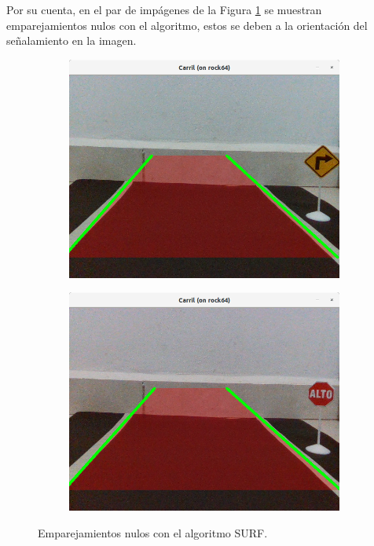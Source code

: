 \par Por su cuenta, en el par de impágenes de la Figura \ref{fig:NSURF} se muestran emparejamientos nulos con el algoritmo, estos se deben a la orientación del señalamiento en la imagen.
\begin{figure}[htbp!]
	\centering
	\begin{subfigure}[htbp!]{0.4\textwidth}
		\includegraphics[width=\textwidth]{./Figuras/NSURF1}
	\end{subfigure}
	\begin{subfigure}[htbp!]{0.4\textwidth}
		\includegraphics[width=\textwidth]{./Figuras/NSURF2}
	\end{subfigure}
	\caption{Emparejamientos nulos con el algoritmo SURF.}
	\label{fig:NSURF}
\end{figure}

